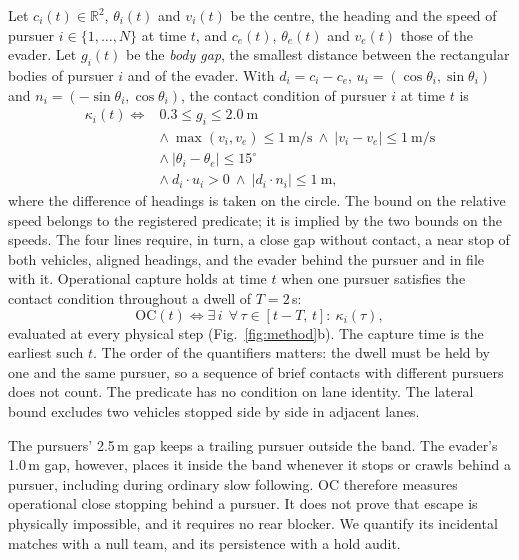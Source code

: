 \documentclass[5p,twocolumn]{elsarticle}
\begin{document}
Let $c_i(t)\in\mathbb{R}^2$, $\theta_i(t)$ and $v_i(t)$ be the centre, the heading and the speed of pursuer
$i\in\{1,\dots,N\}$ at time $t$, and $c_e(t)$, $\theta_e(t)$ and $v_e(t)$ those of the evader. Let $g_i(t)$ be the
\emph{body gap}, the smallest distance between the rectangular bodies of pursuer $i$ and of the evader. With
$d_i=c_i-c_e$, $u_i=(\cos\theta_i,\sin\theta_i)$ and $n_i=(-\sin\theta_i,\cos\theta_i)$, the contact condition of
pursuer $i$ at time $t$ is
\begin{align}
\label{eq:contact}
\kappa_i(t) \iff{} & 0.3 \le g_i \le 2.0\ \text{m} \nonumber \\
& \wedge\ \max(v_i,v_e) \le 1\ \text{m/s} \ \wedge\ |v_i-v_e| \le 1\ \text{m/s} \nonumber \\
& \wedge\ |\theta_i-\theta_e| \le 15^\circ \nonumber \\
& \wedge\ d_i\cdot u_i > 0 \ \wedge\ |d_i\cdot n_i| \le 1\ \text{m},
\end{align}
where the difference of headings is taken on the circle. The bound on the relative speed belongs to the registered
predicate; it is implied by the two bounds on the speeds. The four lines require, in turn, a close gap without
contact, a near stop of both vehicles, aligned headings, and the evader behind the pursuer and in file with it.
Operational capture holds at time $t$ when one pursuer satisfies the contact condition throughout a dwell of
$T=2$\,s:
\begin{equation}
\label{eq:oc}
\mathrm{OC}(t) \iff \exists\, i\ \ \forall\, \tau\in[t-T,\,t]:\ \kappa_i(\tau),
\end{equation}
evaluated at every physical step (Fig.~\ref{fig:method}b). The capture time is the earliest such $t$. The order of
the quantifiers matters: the dwell must be held by one and the same pursuer, so a sequence of brief contacts with
different pursuers does not count. The predicate has no condition on lane identity. The lateral bound excludes two
vehicles stopped side by side in adjacent lanes.

The pursuers' 2.5\,m gap keeps a trailing pursuer outside the band. The evader's 1.0\,m gap, however, places it inside
the band whenever it stops or crawls behind a pursuer, including during ordinary slow following. OC therefore measures
operational close stopping behind a pursuer. It does not prove that escape is physically impossible, and it requires
no rear blocker. We quantify its incidental matches with a null team, and its persistence with a hold audit.
\end{document}
